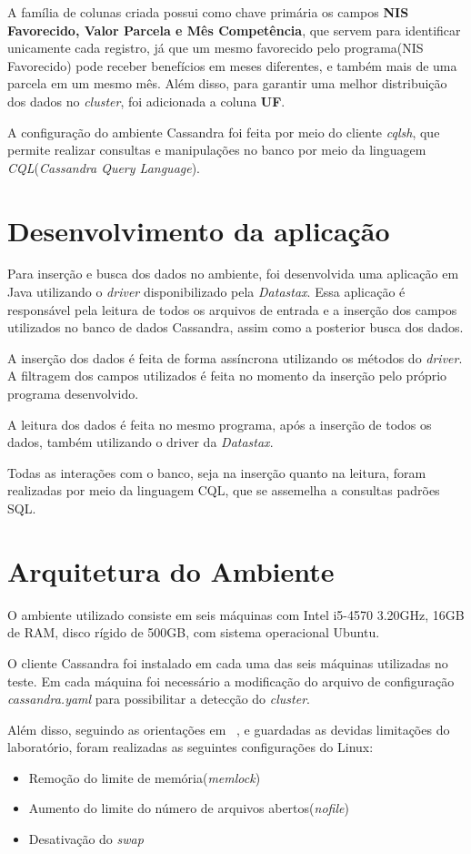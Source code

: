 A família de colunas criada possui como chave primária os campos \textbf{NIS Favorecido, Valor Parcela e Mês Competência}, que servem para identificar unicamente cada registro, já que um mesmo favorecido pelo programa(NIS Favorecido) pode receber benefícios em meses diferentes, e também mais de uma parcela em um mesmo mês. Além disso, para garantir uma melhor distribuição dos dados no \emph{cluster}, foi adicionada a coluna \textbf{UF}. 


A configuração do ambiente Cassandra foi feita por meio do cliente \emph{cqlsh}, que permite realizar consultas e manipulações no banco por meio da linguagem \emph{CQL}(\emph{Cassandra Query Language}).

\section{Desenvolvimento da aplicação}
Para inserção e busca dos dados no ambiente, foi desenvolvida uma aplicação em Java utilizando o \emph{driver} disponibilizado pela \emph{Datastax}. Essa aplicação é responsável pela leitura de todos os arquivos de entrada e a inserção dos campos utilizados no banco de dados Cassandra, assim como a posterior busca dos dados.

A inserção dos dados é feita de forma assíncrona utilizando os métodos do \emph{driver}. A filtragem dos campos utilizados é feita no momento da inserção pelo próprio programa desenvolvido.

A leitura dos dados é feita no mesmo programa, após a inserção de todos os dados, também utilizando o driver da \emph{Datastax}.

Todas as interações com o banco, seja na inserção quanto na leitura, foram realizadas por meio da linguagem CQL, que se assemelha a consultas padrões SQL.

\section{Arquitetura do Ambiente}
O ambiente utilizado consiste em seis máquinas com Intel i5-4570 3.20GHz, 16GB de RAM, disco rígido de 500GB, com sistema operacional Ubuntu.

O cliente Cassandra foi instalado em cada uma das seis máquinas utilizadas no teste. Em cada máquina foi necessário a modificação do arquivo de configuração \emph{cassandra.yaml} para possibilitar a detecção do \emph{cluster}.

Além disso, seguindo as orientações em ~\cite{cassandrasettings}, e guardadas as devidas limitações do laboratório, foram realizadas as seguintes configurações do Linux:
\begin{itemize}
	\item Remoção do limite de memória(\emph{memlock})
	\item Aumento do limite do número de arquivos abertos(\emph{nofile})
	\item Desativação do \emph{swap}
\end{itemize}




